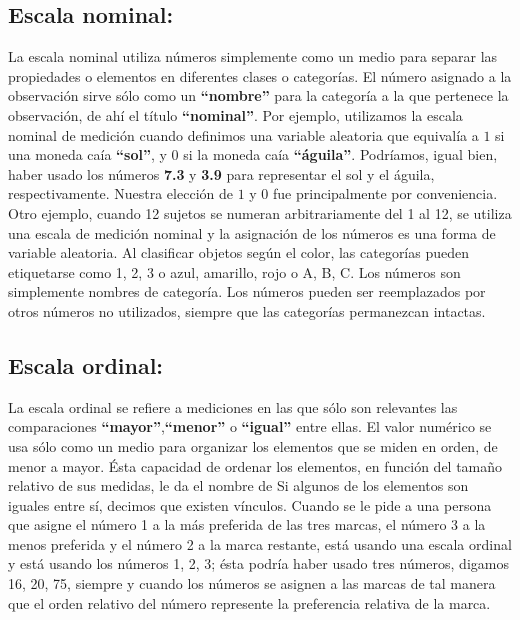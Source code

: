 \documentclass[
  a4paper,
  oneside,
  openany]{book}
\begin{document}
\hypertarget{escala-nominal}{%
\subsection{Escala nominal:}\label{escala-nominal}}

La escala nominal utiliza números simplemente como un medio para separar las propiedades o elementos en diferentes clases o categorías. El número asignado a la observación sirve sólo como un \textbf{``nombre''} para la categoría a la que pertenece la observación, de ahí el título \textbf{``nominal''}. Por ejemplo, utilizamos la escala nominal de medición cuando definimos una variable aleatoria que equivalía a \(1\) si una moneda caía \textbf{``sol''}, y \(0\) si la moneda caía \textbf{``águila''}. Podríamos, igual bien, haber usado los números \textbf{7.3} y \textbf{3.9} para representar el sol y el águila, respectivamente. Nuestra elección de \(1\) y \(0\) fue principalmente por conveniencia.
Otro ejemplo, cuando 12 sujetos se numeran arbitrariamente del 1 al 12, se utiliza una escala de medición nominal y la asignación de los números es una forma de variable aleatoria. Al clasificar objetos según el color, las categorías pueden etiquetarse como 1, 2, 3 o azul, amarillo, rojo o A, B, C. Los números son simplemente nombres de categoría. Los números pueden ser reemplazados por otros números no utilizados, siempre que las categorías permanezcan intactas.

\hypertarget{escala-ordinal}{%
\subsection{Escala ordinal:}\label{escala-ordinal}}

La escala ordinal se refiere a mediciones en las que sólo son relevantes las comparaciones \textbf{``mayor''},\textbf{``menor''} o \textbf{``igual''} entre ellas. El valor numérico se usa sólo como un medio para organizar los elementos que se miden en orden, de menor a mayor.
Ésta capacidad de ordenar los elementos, en función del tamaño relativo de sus medidas, le da el nombre de
Si algunos de los elementos son iguales entre sí, decimos que existen vínculos. Cuando se le pide a una persona que asigne el número 1 a la más preferida de las tres marcas, el número 3 a la menos preferida y el número 2 a la marca restante, está usando una escala ordinal y está usando los números 1, 2, 3; ésta podría haber usado tres números, digamos 16, 20, 75, siempre y cuando los números se asignen a las marcas de tal manera que el orden relativo del número represente la preferencia relativa de la marca.
\end{document}
